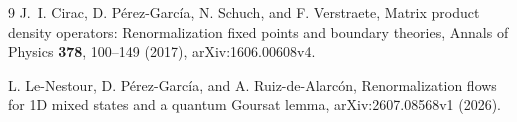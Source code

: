 \begin{thebibliography}{9}
	J.~I. Cirac, D. P\'erez-Garc\'ia, N. Schuch, and F. Verstraete,
	Matrix product density operators: Renormalization fixed points and
	boundary theories,
	Annals of Physics \textbf{378}, 100--149 (2017),
	arXiv:1606.00608v4.

	L. Le-Nestour, D. P\'erez-Garc\'ia, and A. Ruiz-de-Alarc\'on,
	Renormalization flows for 1D mixed states and a quantum Goursat lemma,
	arXiv:2607.08568v1 (2026).
\end{thebibliography}
